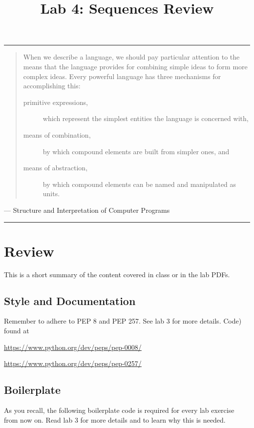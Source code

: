 \documentclass[11pt]{cselabheader}
\title{Lab 4: Sequences Review}
\begin{document}
\maketitle
{}
\hrule

\begin{quotation}
When we describe a language, we should pay particular attention to the means that the language provides for combining simple ideas to form more complex ideas. Every powerful language has three mechanisms for accomplishing this:
\begin{description}
\item[primitive expressions,] which represent the simplest entities the language is concerned with,
\item[means of combination,] by which compound elements are built from simpler ones, and
\item[means of abstraction,] by which compound elements can be named and manipulated as units.
\end{description}
\end{quotation}
\begin{flushright}
--- Structure and Interpretation of Computer Programs
\end{flushright}
\hrule

\tableofcontents

\pagebreak
{}
\section{Review}
This is a short summary of the content covered in class or in the lab PDFs.

\subsection{Style and Documentation}
Remember to adhere to PEP 8 and PEP 257. See lab 3 for more details.
Code) found at
\begin{center}
  \url{https://www.python.org/dev/peps/pep-0008/}

  \url{https://www.python.org/dev/peps/pep-0257/}
\end{center}

\subsection{Boilerplate}
\label{subsec:boiler}

As you recall, the following boilerplate code is required for every lab
exercise from now on. Read lab 3 for more details and to learn why this is
needed.
\end{document}
